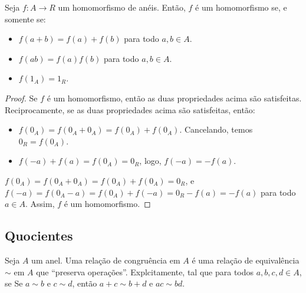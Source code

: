 \begin{prop}
    Seja $f:A\rightarrow R$ um homomorfismo de anéis. Então, $f$ é um homomorfismo se, e somente se:
    \begin{itemize}
        \item $f(a+b)=f(a)+f(b)$ para todo $a, b \in A$.
        \item $f(ab)=f(a)f(b)$ para todo $a, b \in A$.
        \item $f(1_A)=1_R$.
    \end{itemize}
\end{prop}
\begin{proof}
    Se $f$ é um homomorfismo, então as duas propriedades acima são satisfeitas. Reciprocamente, se as duas propriedades acima são satisfeitas, então:
    \begin{itemize}
    \item $f(0_A)=f(0_A+0_A)=f(0_A)+f(0_A)$. Cancelando, temos $0_R=f(0_A)$.
    \item $f(-a)+f(a)=f(0_A)=0_R$, logo, $f(-a)=-f(a)$.
    \end{itemize} $f(0_A)=f(0_A+0_A)=f(0_A)+f(0_A)=0_R$, e $f(-a)=f(0_A-a)=f(0_A)+f(-a)=0_R-f(a)=-f(a)$ para todo $a \in A$. Assim, $f$ é um homomorfismo.
\end{proof}

\subsection{Quocientes}
\begin{definition}
    Seja $A$ um anel. Uma relação de congruência em $A$ é uma relação de equivalência $\sim$ em $A$ que ``preserva operações''. Explcitamente, tal que para todos $a, b, c, d \in A$, se Se $a\sim b$ e $c\sim d$, então $a+c\sim b+d$ e $ac\sim bd$.
\end{definition}

